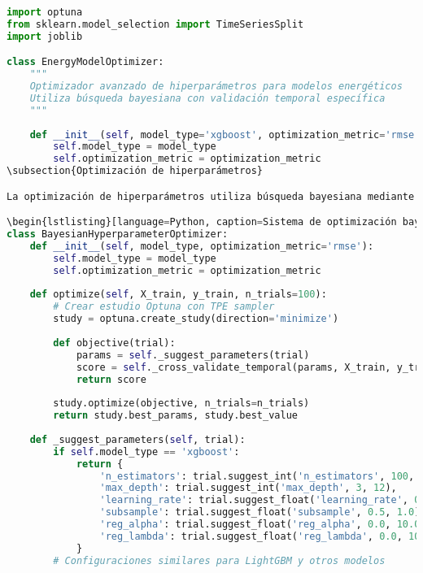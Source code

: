 \begin{lstlisting}[language=Python, caption=Optimización bayesiana de hiperparámetros]
import optuna
from sklearn.model_selection import TimeSeriesSplit
import joblib

class EnergyModelOptimizer:
    """
    Optimizador avanzado de hiperparámetros para modelos energéticos
    Utiliza búsqueda bayesiana con validación temporal específica
    """
    
    def __init__(self, model_type='xgboost', optimization_metric='rmse'):
        self.model_type = model_type
        self.optimization_metric = optimization_metric
\subsection{Optimización de hiperparámetros}

La optimización de hiperparámetros utiliza búsqueda bayesiana mediante Optuna para encontrar la configuración óptima de cada modelo. Este enfoque es más eficiente que grid search o random search, especialmente importante dado el coste computacional de entrenar modelos con grandes datasets.

\begin{lstlisting}[language=Python, caption=Sistema de optimización bayesiana]
class BayesianHyperparameterOptimizer:
    def __init__(self, model_type, optimization_metric='rmse'):
        self.model_type = model_type
        self.optimization_metric = optimization_metric
        
    def optimize(self, X_train, y_train, n_trials=100):
        # Crear estudio Optuna con TPE sampler
        study = optuna.create_study(direction='minimize')
        
        def objective(trial):
            params = self._suggest_parameters(trial)
            score = self._cross_validate_temporal(params, X_train, y_train)
            return score
        
        study.optimize(objective, n_trials=n_trials)
        return study.best_params, study.best_value
    
    def _suggest_parameters(self, trial):
        if self.model_type == 'xgboost':
            return {
                'n_estimators': trial.suggest_int('n_estimators', 100, 1500),
                'max_depth': trial.suggest_int('max_depth', 3, 12),
                'learning_rate': trial.suggest_float('learning_rate', 0.01, 0.3),
                'subsample': trial.suggest_float('subsample', 0.5, 1.0),
                'reg_alpha': trial.suggest_float('reg_alpha', 0.0, 10.0),
                'reg_lambda': trial.suggest_float('reg_lambda', 0.0, 10.0)
            }
        # Configuraciones similares para LightGBM y otros modelos
    

\end{lstlisting}
